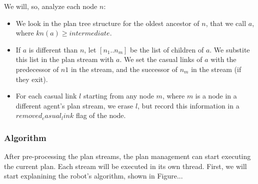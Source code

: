 We will, so, analyze each node $n$:
\begin{itemize}
\item We look in the plan tree structure for the oldest ancestor of $n$, that we call $a$, where $kn(a) \geq intermediate$.
\item If $a$ is different than $n$, let $[n_1..n_m]$ be the list of children of $a$. We substite this list in the plan stream with $a$. We set the casual links of $a$ with the predecessor of $n1$ in the stream, and the successor of $n_m$ in the stream (if they exit).
\item For each casual link $l$ starting from any node $m$, where $m$ is a node in a different agent's plan stream, we erase $l$, but record this information in a $removed_casual_link$ flag of the node.
\end{itemize}


\subsubsection{Algorithm}
After pre-processing the plan streams, the plan management can start executing the current plan. Each stream will be executed in its own thread. First, we will start explanining the robot's algorithm, shown in Figure...

